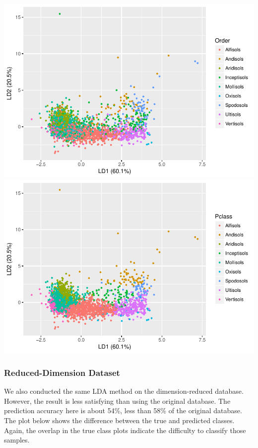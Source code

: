 \documentclass[]{article}
\begin{document}
\includegraphics{Project1_files/figure-latex/lda vis - FEI-1.pdf}
\includegraphics{Project1_files/figure-latex/lda vis - FEI-2.pdf}

\subsubsection{Reduced-Dimension
Dataset}\label{reduced-dimension-dataset}

We also conducted the same LDA method on the dimension-reduced database.
However, the result is less satisfying than using the original database.
The prediction accuracy here is about 54\%, less than 58\% of the
original database. The plot below shows the difference between the true
and predicted classes. Again, the overlap in the true class plots
indicate the difficulty to classify those samples.
\end{document}
